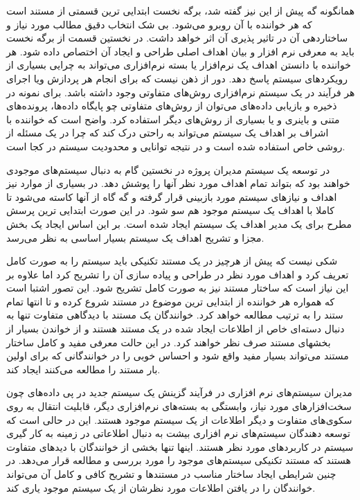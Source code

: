   همانگونه گه پیش از این نیز گفته شد، برگه نخست ابتدایی ترین قسمتی از مستند است
  که هر خواننده با آن روبرو می‌شود. بی شک انتخاب دقیق مطالب مورد نیاز و
  ساختاردهی آن در تاثیر پذیری آن اثر خواهد داشت.
  در نخستین قسمت از برگه نخست باید به معرفی نرم افزار و بیان اهداف اصلی طراحی و
  ایجاد آن اختصاص داده شود.
  هر خواننده با دانستن اهداف یک نرم‌افزار یا بسته نرم‌افزاری می‌تواند به چرایی
  بسیاری از رویکردهای سیستم پاسخ دهد.
  دور از ذهن نیست که برای انجام هر پردازش ویا اجرای هر فرآیند در یک سیستم
  نرم‌افزاری روش‌های متفاوتی وجود داشته باشد. برای نمونه در ذخیره و بازیابی
  داده‌های می‌توان از روش‌های متفاوتی چو پایگاه داده‌ها، پرونده‌های متنی و
  باینری و یا بسیاری از روش‌های دیگر استفاده کرد. واضح است که خواننده با اشراف
  بر اهداف یک سیستم می‌تواند به راحتی درک کند که چرا در یک مسئله از روشی خاص
  استفاده شده است و در نتیجه توانایی و محدودیت سیستم در کجا است.

  در توسعه یک سیستم مدیران پروژه در نخستین گام به دنبال سیستم‌های موجودی خواهند
  بود که بتواند تمام اهداف مورد نظر آنها را پوشش دهد. در بسیاری از موارد نیز
  اهداف و نیازهای سیستم مورد بازبینی قرار گرفته و گه گاه از آنها کاسته می‌شود تا
  کاملا با اهداف یک سیستم موجود هم سو شود. در این صورت ابتدایی ترین پرسش مطرح
  برای یک مدیر اهداف یک سیستم ایجاد شده است. بر این اساس ایجاد یک بخش مجزا و
  تشریح اهداف یک سیستم بسیار اساسی به نظر می‌رسد.

  شکی نیست که پیش از هرچیز در یک مستند تکنیکی باید سیستم را به صورت کامل تعریف
  کرد و اهداف مورد نظر در طراحی و پیاده سازی آن را تشریح کرد اما علاوه بر این
  نیاز است که ساختار مستند نیز به صورت کامل تشریح شود. این تصور اشتبا است که
  همواره هر خواننده از ابتدایی ترین موضوع در مستند شروع کرده و تا انتها تمام
  ستند را به ترتیب مطالعه خواهد کرد.
  خوانندگان یک مستند با دیدگاهی متفاوت تنها به دنبال دسته‌ای خاص از اطلاعات
  ایجاد شده در یک مستند هستند و از خواندن بسیار از بخشهای مستند صرف نظر خواهند
  کرد. در این حالت معرفی مفید و کامل ساختار مستند می‌تواند بسیار مفید واقع شود و
  احساس خوبی را در خوانندگانی که برای اولین بار مستند را مطالعه می‌کنند ایجاد
  کند.

  مدیران  سیستم‌های نرم افزاری در فرآیند گزینش یک سیستم جدید در پی داده‌های چون
  سخت‌افزارهای مورد نیاز، وابستگی به بسته‌های نرم‌افزاری دیگر، قابلیت انتقال به
  روی سکوی‌های متفاوت و دیگر اطلاعات از یک سیستم موجود هستند. این در حالی است که
  توسعه دهندگان سیستم‌های نرم افزاری بیشت به دنبال اطلاعاتی در زمینه به کار گیری
  سیستم در کاربردهای مورد نظر هستند. اینها تنها بخشی از خوانندگان با دیدهای
  متفاوت هستند که مستند تکنیکی سیستم‌های موجود را مورد بررسی و مطالعه قرار
  می‌دهد. در چنین شرایطی ایجاد ساختار مناسب در مستندها و تشریح کافی و کامل آن
  می‌تواند خوانندگان را در یافتن اطلاعات مورد نظرشان از یک سیستم موجود یاری کند.

